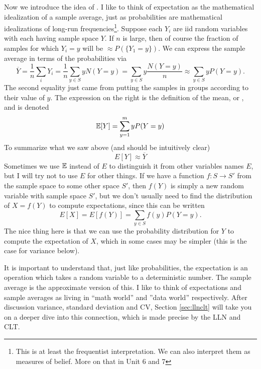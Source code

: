 Now we introduce the idea of . I like to think of expectation as the mathematical idealization of a sample average, just as probabilities are mathematical idealizations of long-run frequencies\footnote{This is at least the frequentist interpretation. We can also interpret them as measures of belief. More on that in Unit 6 and 7}.   Suppose each $Y_i$ are iid random variables with each having sample space $Y$. If $n$ is large, then of course the fraction of samples for which $Y_i= y$ will be $\approx P(\{Y_1=y\})$. We can express the sample average in terms of the probabilities via
 \begin{equation*}
\overline{Y} =  \frac{1}{n}\sum_{i}Y_i = \frac{1}{n} \sum_{y \in S} y N(Y=y) =\sum_{y \in S} y \frac{N(Y=y) }{n}\approx  \sum_{y\in S} y P(Y=y).
\end{equation*}
The second equality just came from putting the samples in groups according to their value of $y$. 
The expression on the right is the definition of the mean, or , and is denoted
\begin{equation}
\mathbb E[Y] = \sum_{y=1}^m y P(Y=y)
\end{equation}
  To summarize what we saw above (and should be intuitively clear) 
 \begin{equation}\label{eq:EappoverY}
 E[Y] \approx \overline{Y}
 \end{equation}
 Sometimes we use $\mathbb E$ instead of $E$ to distinguish it from other variables names $E$, but I will try not to use $E$ for other things. 
If we have a function $f:S \to S'$ from the sample space to some other space $S'$, then $f(Y)$ is simply a new random variable with sample space $S'$, but we don't usually need to find the distribution of $X = f(Y)$ to compute expectations, since this can be written  
\begin{equation}\label{eq:Efy}
E[X] = E[f(Y)] = \sum_{y\in S} f(y) P(Y=y). 
\end{equation}
The nice thing here is that we can use the probability distribution for $Y$ to compute the expectation of $X$, which in some cases may be simpler (this is the case for variance below). 

 It is important to understand that, just like probabilities, the expectation is an operation which takes a random variable to a deterministic number. The sample average is the approximate version of this. I like to think of expectations and sample averages as living in ``math world'' and ''data world'' respectively. After discussion variance, standard deviation and CV, Section \ref{sec:llnclt} will take you on a deeper dive into this connection, which is made precise by the LLN and CLT. 


